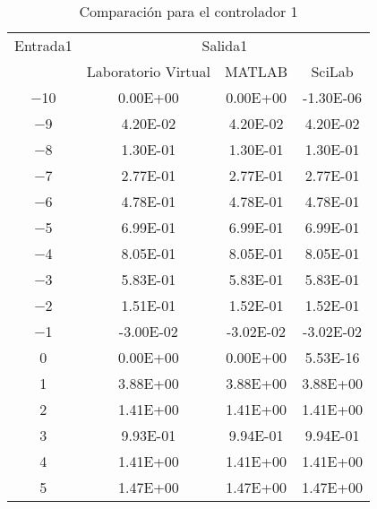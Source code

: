         {\setlength\LTleft{0pt}
        \setlength\LTright{0pt}
        \centering
        \renewcommand{\arraystretch}{0.89}
        \begin{longtable}{c @{\extracolsep{\fill}} ccc}
            \caption[Comparación de diseño de controladores difusos - controlador 1]{Comparación para el controlador 1} 
            \label{tab:C1Difuso} \\
            \toprule
            Entrada1  &        \multicolumn{3}{c}{Salida1}        \\ \cmidrule{1-1} \cmidrule{2-4}
                    &   Laboratorio Virtual  & MATLAB & SciLab  \\ \cmidrule{2-2} \cmidrule{3-3} \cmidrule{4-4}
            \endhead
            \bottomrule
            \endfoot
            \num{-10} & \num{0.00E+00}  & \num{0.00E+00}  & \num{-1.30E-06}  \\
            \num{-9}  & \num{4.20E-02}  & \num{4.20E-02}  & \num{4.20E-02}   \\
            \num{-8}  & \num{1.30E-01}  & \num{1.30E-01}  & \num{1.30E-01}   \\
            \num{-7}  & \num{2.77E-01}  & \num{2.77E-01}  & \num{2.77E-01}   \\
            \num{-6}  & \num{4.78E-01}  & \num{4.78E-01}  & \num{4.78E-01}   \\
            \num{-5}  & \num{6.99E-01}  & \num{6.99E-01}  & \num{6.99E-01}   \\
            \num{-4}  & \num{8.05E-01}  & \num{8.05E-01}  & \num{8.05E-01}   \\
            \num{-3}  & \num{5.83E-01}  & \num{5.83E-01}  & \num{5.83E-01}   \\
            \num{-2}  & \num{1.51E-01}  & \num{1.52E-01}  & \num{1.52E-01}   \\
            \num{-1}  & \num{-3.00E-02} & \num{-3.02E-02} & \num{-3.02E-02}  \\
            \num{0}   & \num{0.00E+00}  & \num{0.00E+00}  & \num{5.53E-16}   \\
            \num{1}   & \num{3.88E+00}  & \num{3.88E+00}  & \num{3.88E+00}   \\
            \num{2}   & \num{1.41E+00}  & \num{1.41E+00}  & \num{1.41E+00}   \\
            \num{3}   & \num{9.93E-01}  & \num{9.94E-01}  & \num{9.94E-01}   \\
            \num{4}   & \num{1.41E+00}  & \num{1.41E+00}  & \num{1.41E+00}   \\
            \num{5}   & \num{1.47E+00}  & \num{1.47E+00}  & \num{1.47E+00}   \\

\end{longtable}}
